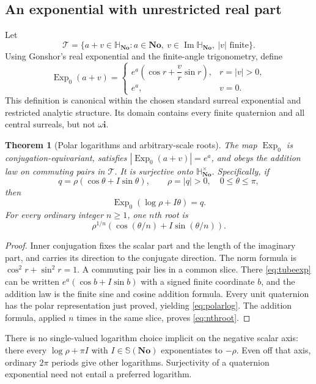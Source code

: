 \documentclass[11pt,letterpaper]{article}
\numberwithin{equation}{section}
\newtheorem{theorem}{Theorem}[section]
\theoremstyle{definition}
\theoremstyle{remark}
\newcommand{\No}{\mathbf{No}}
\newcommand{\SQ}{\mathbb H_{\No}}
\newcommand{\ii}{\mathbf i}
\newcommand{\Ima}{\operatorname{Im}}
\newcommand{\Exp}{\operatorname{Exp}}
\begin{document}
\subsection{An exponential with unrestricted real part}
Let
\[
 \mathcal T=\{a+v\in\SQ:a\in\No,\ v\in\Ima\SQ,\ |v|\text{ finite}\}.
\]
Using Gonshor's real exponential and the finite-angle trigonometry, define
\begin{equation}\label{eq:tubeexp}
 \Exp_0(a+v)=
 \begin{cases}
 e^a\left(\cos r+\dfrac{v}{r}\sin r\right),&r=|v|>0,\\
 e^a,&v=0.
 \end{cases}
\end{equation}
This definition is canonical within the chosen standard surreal exponential and restricted
analytic structure. Its domain contains every finite quaternion and all central surreals,
but not $\omega\ii$.

\begin{theorem}[Polar logarithms and arbitrary-scale roots]\label{thm:polarlog}
The map $\Exp_0$ is conjugation-equivariant, satisfies
$|\Exp_0(a+v)|=e^a$, and obeys the addition law on commuting pairs in $\mathcal T$.
It is surjective onto $\SQ^\times$. Specifically, if
\[
 q=\rho(\cos\theta+I\sin\theta),\qquad
 \rho=|q|>0,\quad0\le\theta\le\pi,
\]
then
\begin{equation}\label{eq:polarlog}
 \Exp_0(\log\rho+I\theta)=q.
\end{equation}
For every ordinary integer $n\ge1$, one $n$th root is
\begin{equation}\label{eq:nthroot}
 \rho^{1/n}\left(\cos(\theta/n)+I\sin(\theta/n)\right).
\end{equation}
\end{theorem}
\begin{proof}
Inner conjugation fixes the scalar part and the length of the imaginary part, and carries
its direction to the conjugate direction. The norm formula is $\cos^2r+\sin^2r=1$.
A commuting pair lies in a common slice. There \eqref{eq:tubeexp} can be written
$e^a(\cos b+I\sin b)$ with a signed finite coordinate $b$, and the addition law is the
finite sine and cosine addition formula. Every unit quaternion has the polar representation
just proved, yielding \eqref{eq:polarlog}. The addition formula, applied $n$ times in the
same slice, proves \eqref{eq:nthroot}.
\end{proof}

There is no single-valued logarithm choice implicit on the negative scalar axis: there every
$\log\rho+\pi I$ with $I\in\mathbb S(\No)$ exponentiates to $-\rho$. Even off that axis,
ordinary $2\pi$ periods give other logarithms. Surjectivity of a quaternion exponential need
not entail a preferred logarithm.
\end{document}
